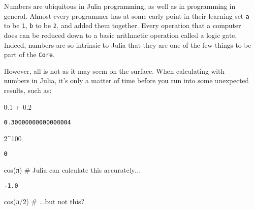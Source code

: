 \documentclass[
  letterpaper,
  DIV=11,
  numbers=noendperiod]{scrreprt}
\newenvironment{Shaded}{\begin{snugshade}}{\end{snugshade}}
\newcommand{\CommentTok}[1]{\textcolor[rgb]{0.37,0.37,0.37}{#1}}
\newcommand{\ConstantTok}[1]{\textcolor[rgb]{0.56,0.35,0.01}{#1}}
\newcommand{\FloatTok}[1]{\textcolor[rgb]{0.68,0.00,0.00}{#1}}
\newcommand{\FunctionTok}[1]{\textcolor[rgb]{0.28,0.35,0.67}{#1}}
\newcommand{\NormalTok}[1]{\textcolor[rgb]{0.00,0.23,0.31}{#1}}
\newcommand{\OperatorTok}[1]{\textcolor[rgb]{0.37,0.37,0.37}{#1}}
\begin{document}
Numbers are ubiquitous in Julia programming, as well as in programming
in general. Almost every programmer has at some early point in their
learning set \texttt{a} to be \texttt{1}, \texttt{b} to be \texttt{2},
and added them together. Every operation that a computer does can be
reduced down to a basic arithmetic operation called a logic gate.
Indeed, numbers are so intrinsic to Julia that they are one of the few
things to be part of the \texttt{Core}.

However, all is not as it may seem on the surface. When calculating with
numbers in Julia, it's only a matter of time before you run into some
unexpected results, such as:

\begin{Shaded}
\begin{Highlighting}[]
\FloatTok{0.1} \OperatorTok{+} \FloatTok{0.2}
\end{Highlighting}
\end{Shaded}

\begin{verbatim}
0.30000000000000004
\end{verbatim}

\begin{Shaded}
\begin{Highlighting}[]
\FloatTok{2}\OperatorTok{\^{}}\FloatTok{100}
\end{Highlighting}
\end{Shaded}

\begin{verbatim}
0
\end{verbatim}

\begin{Shaded}
\begin{Highlighting}[]
\FunctionTok{cos}\NormalTok{(}\ConstantTok{π}\NormalTok{) }\CommentTok{\# Julia can calculate this accurately...}
\end{Highlighting}
\end{Shaded}

\begin{verbatim}
-1.0
\end{verbatim}

\begin{Shaded}
\begin{Highlighting}[]
\FunctionTok{cos}\NormalTok{(}\ConstantTok{π}\OperatorTok{/}\FloatTok{2}\NormalTok{) }\CommentTok{\# ...but not this?}
\end{Highlighting}
\end{Shaded}
\end{document}
